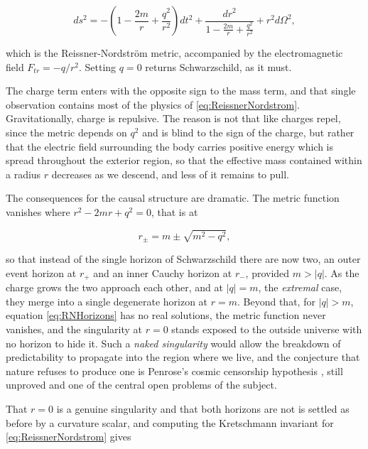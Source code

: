         \begin{equation}\label{eq:ReissnerNordstrom}
            ds^2 = -\left(1 - \frac{2m}{r} + \frac{q^2}{r^2}\right)dt^2 + \frac{dr^2}{1 - \frac{2m}{r} + \frac{q^2}{r^2}} + r^2d\Omega^2,
        \end{equation}

        which is the Reissner-Nordström metric, accompanied by the electromagnetic field $F_{tr}=-q/r^2$. Setting $q=0$ returns Schwarzschild, as it must.

        The charge term enters with the opposite sign to the mass term, and that single observation contains most of the physics of \ref{eq:ReissnerNordstrom}. Gravitationally, charge is repulsive. The reason is not that like charges repel, since the metric depends on $q^2$ and is blind to the sign of the charge, but rather that the electric field surrounding the body carries positive energy which is spread throughout the exterior region, so that the effective mass contained within a radius $r$ decreases as we descend, and less of it remains to pull.

        The consequences for the causal structure are dramatic. The metric function vanishes where $r^2-2mr+q^2=0$, that is at

        \begin{equation}\label{eq:RNHorizons}
            r_{\pm} = m \pm \sqrt{m^2-q^2},
        \end{equation}

        so that instead of the single horizon of Schwarzschild there are now two, an outer event horizon at $r_+$ and an inner Cauchy horizon at $r_-$, provided $m>|q|$. As the charge grows the two approach each other, and at $|q|=m$, the \textit{extremal} case, they merge into a single degenerate horizon at $r=m$. Beyond that, for $|q|>m$, equation \ref{eq:RNHorizons} has no real solutions, the metric function never vanishes, and the singularity at $r=0$ stands exposed to the outside universe with no horizon to hide it. Such a \textit{naked singularity} would allow the breakdown of predictability to propagate into the region where we live, and the conjecture that nature refuses to produce one is Penrose's cosmic censorship hypothesis \citep{penrose1969}, still unproved and one of the central open problems of the subject.

        That $r=0$ is a genuine singularity and that both horizons are not is settled as before by a curvature scalar, and computing the Kretschmann invariant for \ref{eq:ReissnerNordstrom} gives

